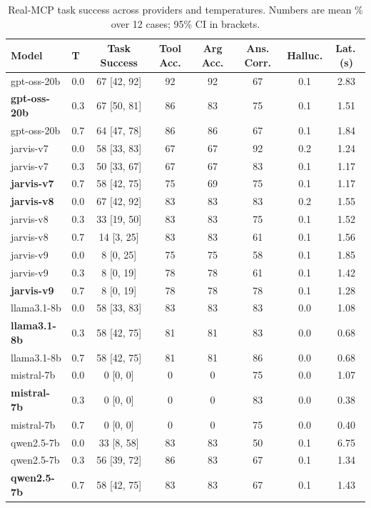 \begin{table}[t]
\centering
\small
\caption{Real-MCP task success across providers and temperatures. Numbers are mean \% over 12 cases; 95\% CI in brackets.}
\label{tab:mcp_bench}
\begin{tabular}{llcccccc}
\toprule
Model & T & Task Success & Tool Acc. & Arg Acc. & Ans. Corr. & Halluc. & Lat.\,(s) \\
\midrule
gpt-oss-20b & 0.0 & 67 [42, 92] & 92 & 92 & 67 & 0.1 & 2.83 \\
\textbf{gpt-oss-20b} & 0.3 & 67 [50, 81] & 86 & 83 & 75 & 0.1 & 1.51 \\
gpt-oss-20b & 0.7 & 64 [47, 78] & 86 & 86 & 67 & 0.1 & 1.84 \\
jarvis-v7 & 0.0 & 58 [33, 83] & 67 & 67 & 92 & 0.2 & 1.24 \\
jarvis-v7 & 0.3 & 50 [33, 67] & 67 & 67 & 83 & 0.1 & 1.17 \\
\textbf{jarvis-v7} & 0.7 & 58 [42, 75] & 75 & 69 & 75 & 0.1 & 1.17 \\
\textbf{jarvis-v8} & 0.0 & 67 [42, 92] & 83 & 83 & 83 & 0.2 & 1.55 \\
jarvis-v8 & 0.3 & 33 [19, 50] & 83 & 83 & 75 & 0.1 & 1.52 \\
jarvis-v8 & 0.7 & 14 [3, 25] & 83 & 83 & 61 & 0.1 & 1.56 \\
jarvis-v9 & 0.0 & 8 [0, 25] & 75 & 75 & 58 & 0.1 & 1.85 \\
jarvis-v9 & 0.3 & 8 [0, 19] & 78 & 78 & 61 & 0.1 & 1.42 \\
\textbf{jarvis-v9} & 0.7 & 8 [0, 19] & 78 & 78 & 78 & 0.1 & 1.28 \\
llama3.1-8b & 0.0 & 58 [33, 83] & 83 & 83 & 83 & 0.0 & 1.08 \\
\textbf{llama3.1-8b} & 0.3 & 58 [42, 75] & 81 & 81 & 83 & 0.0 & 0.68 \\
llama3.1-8b & 0.7 & 58 [42, 75] & 81 & 81 & 86 & 0.0 & 0.68 \\
mistral-7b & 0.0 & 0 [0, 0] & 0 & 0 & 75 & 0.0 & 1.07 \\
\textbf{mistral-7b} & 0.3 & 0 [0, 0] & 0 & 0 & 83 & 0.0 & 0.38 \\
mistral-7b & 0.7 & 0 [0, 0] & 0 & 0 & 75 & 0.0 & 0.40 \\
qwen2.5-7b & 0.0 & 33 [8, 58] & 83 & 83 & 50 & 0.1 & 6.75 \\
qwen2.5-7b & 0.3 & 56 [39, 72] & 86 & 83 & 67 & 0.1 & 1.34 \\
\textbf{qwen2.5-7b} & 0.7 & 58 [42, 75] & 83 & 83 & 67 & 0.1 & 1.43 \\
\bottomrule
\end{tabular}
\end{table}